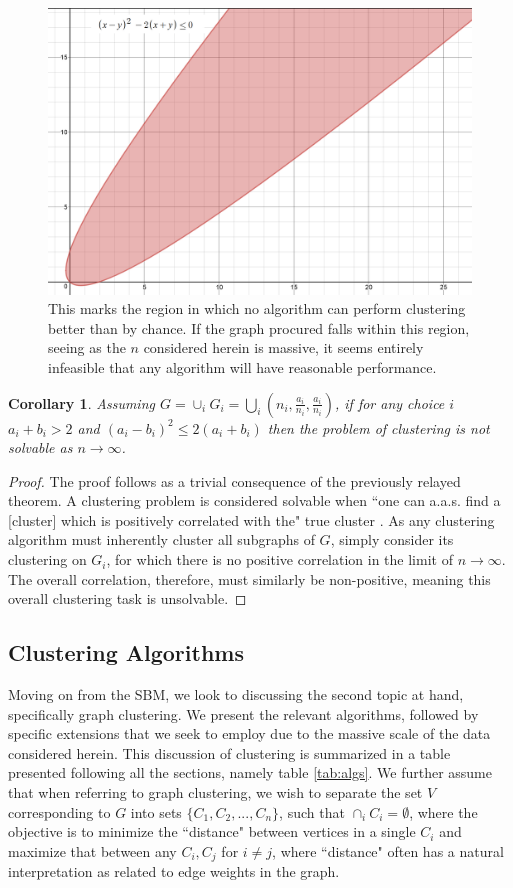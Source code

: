 \documentclass{article}
\newtheorem{corollary}{Corollary}[theorem]
\begin{document}
\begin{figure}
    \label{fig:region}
    \centering
    \includegraphics[width=.60\textwidth]{region.png}
    \caption[Region of No Deanonymization]{This marks the region in which no algorithm can perform clustering better than by chance. If the graph procured falls within this region, seeing as the $n$ considered herein is massive, it seems entirely infeasible that any algorithm will have reasonable performance.}
\end{figure}

\begin{corollary}
Assuming $G=\cup_{i}G_i=\bigcup_{i}(n_i,\frac{a_i}{n_i},\frac{a_i}{n_i})$, if for any choice $i$ $a_i + b_i > 2$ and $(a_i-b_i)^2\le2(a_i+b_i)$ then the problem of clustering is not solvable as $n\rightarrow\infty$.
\end{corollary}

\begin{proof}
The proof follows as a trivial consequence of the previously relayed theorem. A clustering problem is considered solvable when ``one can a.a.s. find a [cluster] which is positively correlated with the" true cluster \cite{sbm}. As any clustering algorithm must inherently cluster all subgraphs of $G$, simply consider its clustering on $G_i$, for which there is no positive correlation in the limit of $n\rightarrow\infty$. The overall correlation, therefore, must similarly be non-positive, meaning this overall clustering task is unsolvable.
\end{proof}

\subsection{Clustering Algorithms}
Moving on from the SBM, we look to discussing the second topic at hand, specifically graph clustering. We present the relevant algorithms, followed by specific extensions that we seek to employ due to the massive scale of the data considered herein. This discussion of clustering is summarized in a table presented following all the sections, namely table \ref{tab:algs}. We further assume that when referring to graph clustering, we wish to separate the set $V$ corresponding to $G$ into sets $\{C_1, C_2, ..., C_n\}$, such that $\cap_{i} C_{i} = \emptyset$, where the objective is to minimize the ``distance" between vertices in a single $C_i$ and maximize that between any $C_i,C_j$ for $i\neq j$, where ``distance" often has a natural interpretation as related to edge weights in the graph. 
\end{document}
